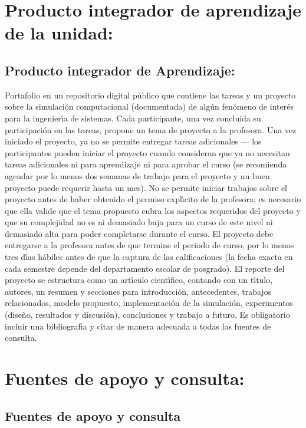 \documentclass[10 pt]{article}
\begin{document}
  \newpage

\section{Producto integrador de aprendizaje de la unidad:}
\subsection{Producto integrador de Aprendizaje:} Portafolio en un
repositorio digital p\'{u}blico que contiene las tareas y un proyecto
sobre la simulaci\'{o}n computacional (documentada) de alg\'{u}n fen\'{o}meno de
inter\'{e}s para la ingenier\'{\i}a de sistemas. Cada participante, una vez
concluida su participaci\'{o}n en las tareas, propone un tema de proyecto
a la profesora. Una vez iniciado el proyecto, ya no se permite
entregar tareas adicionales --- los participantes pueden iniciar el
proyecto cuando consideran que ya no necesitan tareas adicionales ni
para aprendizaje ni para aprobar el curso (se recomienda agendar por
lo menos dos semanas de trabajo para el proyecto y un buen proyecto
puede requerir hasta un mes). No se permite iniciar trabajos sobre el
proyecto antes de haber obtenido el permiso expl\'{\i}cito de la profesora;
es necesario que ella valide que el tema propuesto cubra los aspectos
requeridos del proyecto y que su complejidad no es ni demasiado baja
para un curso de este nivel ni demasiado alta para poder completarse
durante el curso.  El proyecto debe entregarse a la profesora antes de
que termine el periodo de curso, por lo menos tres d\'{\i}as h\'{a}biles antes
de que la captura de las calificaciones (la fecha exacta en cada
semestre depende del departamento escolar de posgrado). El reporte del
proyecto se estructura como un art\'{\i}culo cient\'{\i}fico, contando
con un t\'{\i}tulo, autores, un resumen y secciones para
introducci\'{o}n, antecedentes, trabajos relacionados, modelo
propuesto, implementaci\'{o}n de la simulaci\'{o}n, experimentos
(dise\~{n}o, resultados y discusi\'{o}n), conclusiones y trabajo a
futuro. Es obligatorio incluir una bibliograf\'{\i}a y citar de manera
adecuada a todas las fuentes de consulta.



\section{Fuentes de apoyo y consulta:}
\subsection{Fuentes de apoyo y consulta}
\end{document}
